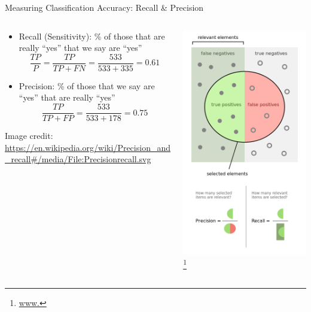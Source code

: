 \documentclass[aspectratio=169]{beamer}
\begin{document}
\begin{frame}{Measuring Classification Accuracy: Recall \& Precision}
\begin{columns}
\begin{column}{0.7\textwidth}
\begin{itemize}
	\item Recall (Sensitivity): \% of those that are really ``yes'' that we say are ``yes''
	$$\frac{TP}{P} = \frac{TP}{TP + FN} = \frac{533}{533 + 335} = 0.61$$
	\item Precision: \% of those that we say are ``yes'' that are really ``yes''
	$$\frac{TP}{TP + FP} = \frac{533}{533 + 178} = 0.75 $$
\end{itemize}
\tiny{Image credit:
\url{https://en.wikipedia.org/wiki/Precision_and_recall\#/media/File:Precisionrecall.svg}
}
\end{column}
\begin{column}{0.3\textwidth}
    \includegraphics[width=1\textwidth]{lectSup/precisionrecall} \tiny{\footnote{\url{www.}}}


\end{column}
\end{columns}
\end{frame}
\end{document}

